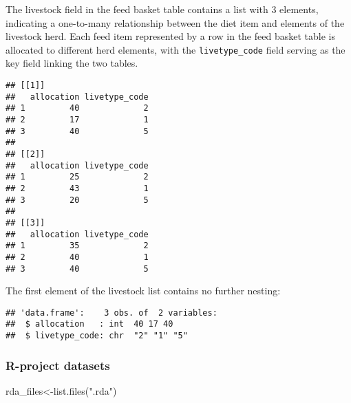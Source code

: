 \documentclass[
]{article}
\newenvironment{Shaded}{\begin{snugshade}}{\end{snugshade}}
\newcommand{\DecValTok}[1]{\textcolor[rgb]{0.00,0.00,0.81}{#1}}
\newcommand{\FunctionTok}[1]{\textcolor[rgb]{0.00,0.00,0.00}{#1}}
\newcommand{\NormalTok}[1]{#1}
\newcommand{\OtherTok}[1]{\textcolor[rgb]{0.56,0.35,0.01}{#1}}
\newcommand{\SpecialCharTok}[1]{\textcolor[rgb]{0.00,0.00,0.00}{#1}}
\newcommand{\StringTok}[1]{\textcolor[rgb]{0.31,0.60,0.02}{#1}}
\begin{document}
The livestock field in the feed basket table contains a list with 3
elements, indicating a one-to-many relationship between the diet item
and elements of the livestock herd. Each feed item represented by a row
in the feed basket table is allocated to different herd elements, with
the \texttt{livetype\_code} field serving as the key field linking the
two tables.

\begin{Shaded}
\end{Shaded}

\begin{verbatim}
## [[1]]
##   allocation livetype_code
## 1         40             2
## 2         17             1
## 3         40             5
## 
## [[2]]
##   allocation livetype_code
## 1         25             2
## 2         43             1
## 3         20             5
## 
## [[3]]
##   allocation livetype_code
## 1         35             2
## 2         40             1
## 3         40             5
\end{verbatim}

The first element of the livestock list contains no further nesting:

\begin{Shaded}
\end{Shaded}

\begin{verbatim}
## 'data.frame':    3 obs. of  2 variables:
##  $ allocation   : int  40 17 40
##  $ livetype_code: chr  "2" "1" "5"
\end{verbatim}

\hypertarget{r-project-datasets}{%
\subsubsection{R-project datasets}\label{r-project-datasets}}

\begin{Shaded}
\begin{Highlighting}[]
\NormalTok{rda\_files}\OtherTok{\textless{}{-}}\FunctionTok{list.files}\NormalTok{(}\StringTok{".rda"}\NormalTok{)}
\end{Highlighting}
\end{Shaded}
\end{document}
